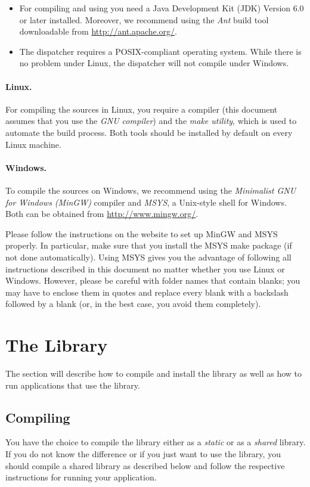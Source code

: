 \begin{itemize}
  \item For compiling and using \jalf you need a Java Development Kit (JDK) Version 6.0 or later installed. Moreover, we recommend using the \emph{Ant} build tool downloadable from \url{http://ant.apache.org/}.
  \item The dispatcher requires a POSIX-compliant operating system. While there is no problem under Linux, the dispatcher will not compile under Windows.
\end{itemize}

\paragraph{Linux.}
For compiling the \cpp sources in Linux, you require a \cpp compiler (this document assumes that you use the \emph{GNU \cpp compiler}) and the \emph{make utility}, which is used to automate the build process. Both tools should be installed by default on every Linux machine.

\paragraph{Windows.}
To compile the \cpp sources on Windows, we recommend using the \emph{Minimalist GNU for Windows (MinGW)} compiler and \emph{MSYS}, a Unix-style shell for Windows. Both can be obtained from \url{http://www.mingw.org/}. 

Please follow the instructions on the website to set up MinGW and MSYS properly. In particular, make sure that you install the MSYS make package (if not done automatically). Using MSYS gives you the advantage of following all instructions described in this document no matter whether you use Linux or Windows. However, please be careful with folder names that contain blanks; you may have to enclose them in quotes and replace every blank with a backslash followed by a blank (or, in the best case, you avoid them completely).

\section{\texorpdfstring{The \libalf \cpp Library}{The libALF C++ Library}}\label{sec:install_libalf}
The section will describe how to compile and install the library as well as how to run applications that use the library.

\subsection{Compiling \libalf}
You have the choice to compile the \libalf library either as a \emph{static} or as a \emph{shared} library. If you do not know the difference or if you just want to use the library, you should compile a shared library as described below and follow the respective instructions for running your application.

